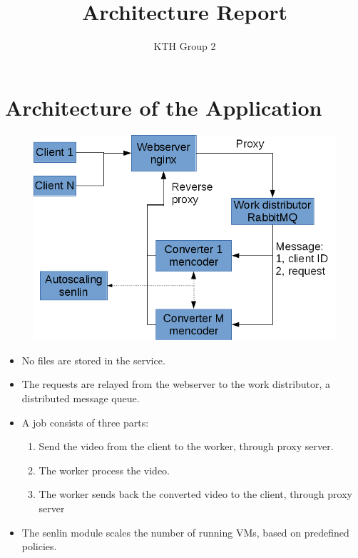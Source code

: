 \documentclass[]{article}
\title{Architecture Report}
\author{KTH Group 2} %
\begin{document}
\maketitle

\section*{Architecture of the Application}
	\begin{figure}[h]
	\centering
	\includegraphics[width=\linewidth]{arch_diagram}
	\caption{}
	\label{fig:arch_diagram}
	\end{figure}

	\begin{itemize}
	\item No files are stored in the service.
	\item The requests are relayed from the webserver to the work distributor, a distributed message queue.
	\item A job consists of three parts:
	\begin{enumerate}
	\item Send the video from the client to the worker, through proxy server.
	\item The worker process the video.
	\item The worker sends back the converted video to the client, through proxy server
	\end{enumerate}
	\item The senlin module scales the number of running VMs, based on predefined policies.
	\end{itemize}
\end{document}
